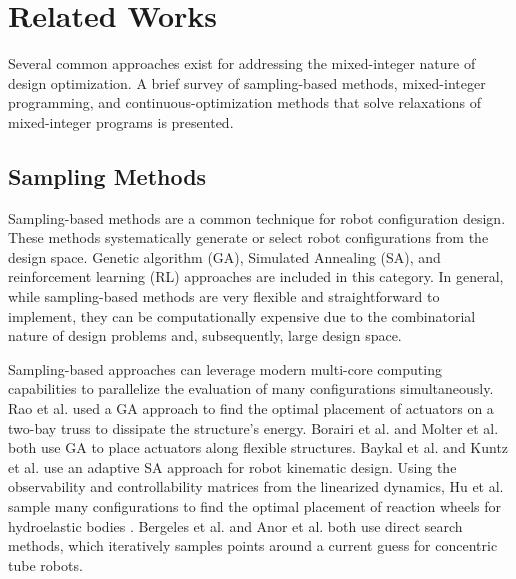 \section{Related Works} \label{sec:capo:related_works}
Several common approaches exist for addressing the mixed-integer nature of design optimization. A brief survey of sampling-based methods, mixed-integer programming, and continuous-optimization methods that solve relaxations of mixed-integer programs is presented.
\subsection{Sampling Methods}
Sampling-based methods are a common technique for robot configuration design. These methods systematically generate or select robot configurations from the design space. Genetic algorithm (GA), Simulated Annealing (SA), and reinforcement learning (RL) approaches are included in this category. In general, while sampling-based methods are very flexible and straightforward to implement, they can be computationally expensive due to the combinatorial nature of design problems and, subsequently, large design space. 

Sampling-based approaches can leverage modern multi-core computing capabilities to parallelize the evaluation of many configurations simultaneously. Rao et al. \cite{Rao1991} used a GA approach to find the optimal placement of actuators on a two-bay truss to dissipate the structure's energy. Borairi et al. \cite{m_borairi_optimal_2017} and Molter et al. \cite{molter_simultaneous_2010} both use GA to place actuators along flexible structures. {Baykal et al. \cite{baykal_asymptotically_2019} and Kuntz et al. \cite{a_kuntz_kinematic_2018} use an adaptive SA approach for robot kinematic design. Using the observability and controllability matrices from the linearized dynamics, Hu et al. sample many configurations to find the optimal placement of reaction wheels for hydroelastic bodies \cite{hu_placement_2015}. Bergeles et al. \cite{c_bergeles_concentric_2015} and Anor et al. \cite{t_anor_algorithms_2011} both use direct search methods, which iteratively samples points around a current guess for concentric tube robots. }


